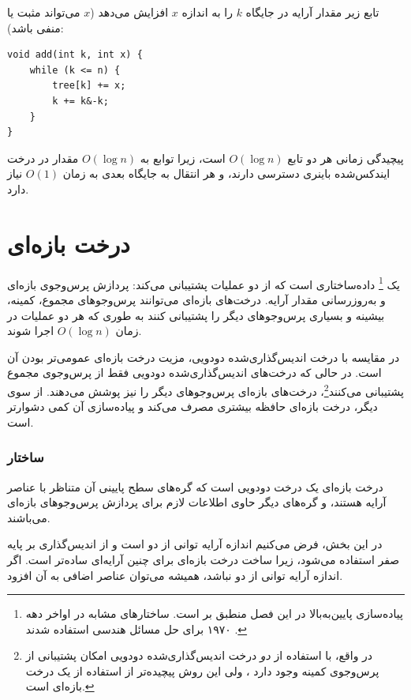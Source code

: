 تابع زیر مقدار آرایه در جایگاه $k$ را به اندازه $x$ افزایش می‌دهد
($x$ می‌تواند مثبت یا منفی باشد):
\begin{lstlisting}
void add(int k, int x) {
    while (k <= n) {
        tree[k] += x;
        k += k&-k;
    }
}
\end{lstlisting}

پیچیدگی زمانی هر دو تابع
$O(\log n)$ است، زیرا توابع به $O(\log n)$
مقدار در درخت ایندکس‌شده باینری دسترسی دارند، و هر انتقال
به جایگاه بعدی به زمان $O(1)$ نیاز دارد.

\section{درخت بازه‌ای}


یک \footnote{پیاده‌سازی پایین‌به‌بالا در این فصل منطبق بر \cite{sta06} است. ساختارهای مشابه در اواخر دهه ۱۹۷۰ برای حل مسائل هندسی استفاده شدند \cite{ben80}.} داده‌ساختاری است که از دو عملیات پشتیبانی می‌کند: پردازش پرس‌وجوی بازه‌ای و به‌روزرسانی مقدار آرایه. درخت‌های بازه‌ای می‌توانند پرس‌وجوهای مجموع، کمینه، بیشینه و بسیاری پرس‌وجوهای دیگر را پشتیبانی کنند به طوری که هر دو عملیات در زمان $O(\log n)$ اجرا شوند.

در مقایسه با درخت اندیس‌گذاری‌شده دودویی، مزیت درخت بازه‌ای عمومی‌تر بودن آن است. در حالی که درخت‌های اندیس‌گذاری‌شده دودویی فقط از پرس‌وجوی مجموع پشتیبانی می‌کنند\footnote{در واقع، با استفاده از \emph{دو} درخت اندیس‌گذاری‌شده دودویی امکان پشتیبانی از پرس‌وجوی کمینه وجود دارد \cite{dim15}، ولی این روش پیچیده‌تر از استفاده از یک درخت بازه‌ای است.}، درخت‌های بازه‌ای پرس‌وجوهای دیگر را نیز پوشش می‌دهند. از سوی دیگر، درخت بازه‌ای حافظه بیشتری مصرف می‌کند و پیاده‌سازی آن کمی دشوارتر است.

\subsubsection{ساختار}

درخت بازه‌ای یک درخت دودویی است که گره‌های سطح پایینی آن متناظر با عناصر آرایه هستند، و گره‌های دیگر حاوی اطلاعات لازم برای پردازش پرس‌وجوهای بازه‌ای می‌باشند.

در این بخش، فرض می‌کنیم اندازه آرایه توانی از دو است و از اندیس‌گذاری بر پایه صفر استفاده می‌شود، زیرا ساخت درخت بازه‌ای برای چنین آرایه‌ای ساده‌تر است. اگر اندازه آرایه توانی از دو نباشد، همیشه می‌توان عناصر اضافی به آن افزود.

